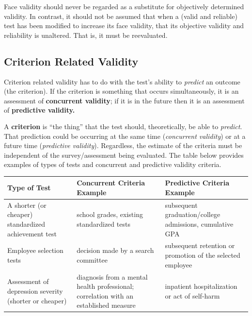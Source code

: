\documentclass[
  english,
]{book}
\begin{document}
Face validity should never be regarded as a substitute for objectively determined validity. In contrast, it should not be assumed that when a (valid and reliable) test has been modified to increase its face validity, that its objective validity and reliability is unaltered. That is, it must be reevaluated.

\hypertarget{criterion-related-validity}{%
\subsection{Criterion Related Validity}\label{criterion-related-validity}}

Criterion related validity has to do with the test's ability to \emph{predict} an outcome (the criterion). If the criterion is something that occurs simultaneously, it is an assessment of \textbf{concurrent validity}; if it is in the future then it is an assessment of \textbf{predictive validity.}

A \textbf{criterion} is ``the thing'' that the test should, theoretically, be able to \emph{predict}. That prediction could be occurring at the same time (\emph{concurrent validity}) or at a future time (\emph{predictive validity}). Regardless, the estimate of the criteria must be independent of the survey/assessment being evaluated. The table below provides examples of types of tests and concurrent and predictive validity criteria.

\begin{longtable}[]{@{}
  >{\raggedright\arraybackslash}p{}
  >{\raggedright\arraybackslash}p{}
  >{\raggedright\arraybackslash}p{}@{}}
\toprule
Type of Test & Concurrent Criteria Example & Predictive Criteria Example \\
\midrule
\endhead
A shorter (or cheaper) standardized achievement test & school grades, existing standardized tests & subsequent graduation/college admissions, cumulative GPA \\
Employee selection tests & decision made by a search committee & subsequent retention or promotion of the selected employee \\
Assessment of depression severity (shorter or cheaper) & diagnosis from a mental health professional; correlation with an established measure & inpatient hospitalization or act of self-harm \\
\bottomrule
\end{longtable}
\end{document}
